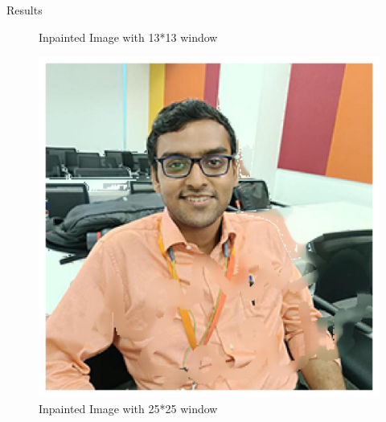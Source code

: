 \documentclass{beamer}
\begin{document}
\begin{frame}{Results}
\begin{figure}[h]
\begin{minipage}{0.32\textwidth}
        \caption{Inpainted Image with 13*13 window}
    \end{minipage}
    \hfill
    \begin{minipage}{0.32\textwidth}
        \centering
        \includegraphics[width=\linewidth]{Image_inpainted_ts_25.jpg} %
        \caption{Inpainted Image with 25*25 window}
    \end{minipage}
\end{figure}
    
\end{frame}
\end{document}
